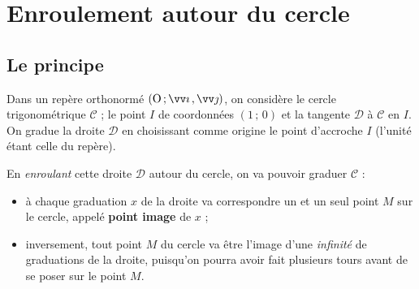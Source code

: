 \documentclass[a4paper,11pt]{article}
\begin{document}
\section{Enroulement autour du cercle}

\subsection{Le principe}

\begin{cdefi}
Dans un repère orthonormé $\Rij$, on considère le cercle trigonométrique $\mathscr{C}$ ; le point $I$ de coordonnées $(1\,;\,0)$ et  la tangente $\mathscr{D}$ à $\mathscr{C}$ en $I$. On gradue la droite $\mathscr{D}$ en choisissant comme origine le point d'accroche $I$ (l'unité étant celle du repère).

En \emph{enroulant} cette droite $\mathscr{D}$ autour du cercle, on va pouvoir \og graduer \fg{}  $\mathscr{C}$ :
\begin{itemize}
	\item à chaque graduation $x$ de la droite va correspondre un et un seul point $M$ sur le cercle, appelé \textbf{point image} de $x$ ;
	\item inversement, tout point $M$ du cercle va être l'image d'une \emph{infinité} de graduations de la droite, puisqu'on pourra avoir fait plusieurs tours avant de se \og poser \fg{} sur le point $M$.
\end{itemize}
\end{cdefi}
\end{document}
